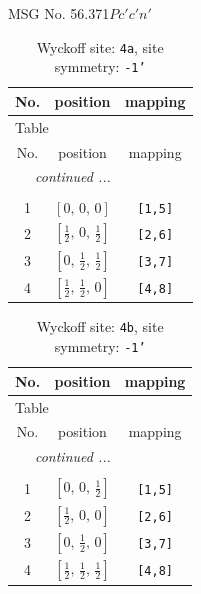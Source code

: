 \documentclass[fleqn,8pt]{jsarticle}
\begin{document}
\setcounter{MaxMatrixCols}{32}

\renewcommand{\tablename}{Table~}
\renewcommand{\figurename}{Figure~}
\begin{center}
\LARGE
MSG No. 56.371\quad$Pc'c'n'$
\end{center}
\renewcommand{\arraystretch}{1.2}
\begin{longtable}{ccc}
\caption{Wyckoff site: {\tt 4a}, site symmetry: {\tt -1'}}
 \\
 \hline \hline
No. & position & mapping \\ \hline \endfirsthead

\multicolumn{2}{l}{\tablename\ \thetable{}} \\
 \hline \hline
No. & position & mapping \\ \hline \endhead

 \hline \hline
\multicolumn{2}{r}{\footnotesize\it continued ...} \\ \endfoot

 \hline \hline
\multicolumn{2}{r}{} \\ \endlastfoot

1 & $\left[ 0,\, 0,\, 0 \right]$ & {\tt [1,5]} \\ \hline
2 & $\left[ \frac{1}{2},\, 0,\, \frac{1}{2} \right]$ & {\tt [2,6]} \\ \hline
3 & $\left[ 0,\, \frac{1}{2},\, \frac{1}{2} \right]$ & {\tt [3,7]} \\ \hline
4 & $\left[ \frac{1}{2},\, \frac{1}{2},\, 0 \right]$ & {\tt [4,8]} \\
\end{longtable}
\renewcommand{\arraystretch}{1.2}
\begin{longtable}{ccc}
\caption{Wyckoff site: {\tt 4b}, site symmetry: {\tt -1'}}
 \\
 \hline \hline
No. & position & mapping \\ \hline \endfirsthead

\multicolumn{2}{l}{\tablename\ \thetable{}} \\
 \hline \hline
No. & position & mapping \\ \hline \endhead

 \hline \hline
\multicolumn{2}{r}{\footnotesize\it continued ...} \\ \endfoot

 \hline \hline
\multicolumn{2}{r}{} \\ \endlastfoot

1 & $\left[ 0,\, 0,\, \frac{1}{2} \right]$ & {\tt [1,5]} \\ \hline
2 & $\left[ \frac{1}{2},\, 0,\, 0 \right]$ & {\tt [2,6]} \\ \hline
3 & $\left[ 0,\, \frac{1}{2},\, 0 \right]$ & {\tt [3,7]} \\ \hline
4 & $\left[ \frac{1}{2},\, \frac{1}{2},\, \frac{1}{2} \right]$ & {\tt [4,8]} \\
\end{longtable}
\end{document}
